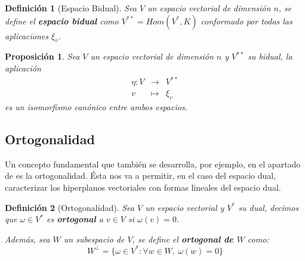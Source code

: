 \documentclass[10pt,a4paper,openright]{book}
\theoremstyle{break}
\newtheorem*{defi}{Definición}
\newtheorem*{prop}{Proposición}
\begin{document}
\begin{defi}[Espacio Bidual]
Sea $V$ un espacio vectorial de dimensión $n$, se define el \textbf{espacio bidual} como $V^{**} = Hom(V^*, K)$ conformado por todas las aplicaciones $\xi_v$.
\end{defi}

\begin{prop}
Sea $V$ un espacio vectorial de dimensión $n$ y $V^{**}$ su bidual, la aplicación
\begin{eqnarray*}
\eta: V &\longrightarrow& V^{**} \\ v &\longmapsto& \xi_v
\end{eqnarray*}
es un isomorfismo canónico entre ambos espacios.
\end{prop}

\subsection{Ortogonalidad}
\label{Ortogonalidad dual}
Un concepto fundamental que también se desarrolla, por ejemplo, en el apartado de  es la ortogonalidad. Ésta nos va a permitir, en el caso del espacio dual, caracterizar los hiperplanos vectoriales con formas lineales del espacio dual.

\begin{defi}[Ortogonalidad]
Sea $V$ un espacio vectorial y $V^*$ su dual, decimos que $\omega \in V^*$ es \textbf{ortogonal} a $v\in V$ si $\omega(v)=0$.

Además, sea $W$ un subespacio de $V$, se define el \textbf{ortogonal de $W$} como:
$$W^\perp=\{\omega \in V^*:\forall w \in W, \ \omega(w)=0\}$$
\end{defi}
\end{document}
